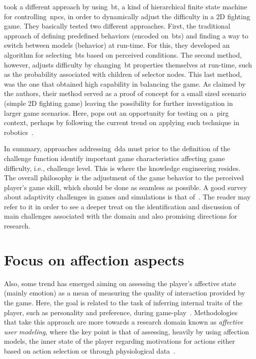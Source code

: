 \cite{sejrsgaard-jacobsen_dynamic_2011} took a different approach by using~\gls{bt}, a kind of hierarchical finite state machine for controlling~\gls{npc}s, in order to dynamically adjust the difficulty in a 2D fighting game. They basically tested two different approaches. First, the traditional approach of defining predefined behaviors (encoded on~\gls{bt}s) and finding a way to switch between models (behavior) at run-time. For this, they developed an algorithm for selecting~\gls{bt}s based on perceived conditions. The second method, however, adjusts difficulty by changing~\gls{bt} properties themselves at run-time, such as the probability associated with children of selector nodes. This last method, was the one that obtained high capability in balancing the game. As claimed by the authors, their method served as a proof of concept for a small sized scenario (simple 2D fighting game) leaving the possibility for further investigation in larger game scenarios. Here, pops out an opportunity for testing on a~\gls{pirg} context, perhaps by following the current trend on applying such technique in robotics~\citep{scheper_behavior_2015, pereira_framework_2015, marzinotto_towards_2014}.

In summary, approaches addressing~\gls{dda} must prior to the definition of the challenge function identify important game characteristics affecting game difficulty, i.e., challenge level. This is where the knowledge engineering resides. The overall philosophy is the adjustment of the game behavior to the perceived player's game skill, which should be done as seamless as possible. A good survey about adaptivity challenges in games and simulations is that of~\cite{lopes_adaptivity_2011}. The reader may refer to it in order to see a deeper treat on the identification and discussion of main challenges associated with the domain and also promising directions for research.

\section{Focus on affection aspects}\label{affectmodeling}
Also, some trend has emerged aiming on assessing the player's affective state (mainly emotion) as a mean of measuring the quality of interaction provided by the game. Here, the goal is related to the task of inferring internal traits of the player, such as personality and preference, during game-play~\citep{van_lankveld_psychologically_2009}. Methodologies that take this approach are more towards a research domain known as \textit{affective user modeling}, where the key point is that of assessing, heavily by using affection models, the inner state of the player regarding motivations for actions either based on action selection or through physiological data~\citep{van_lankveld_psychologically_2009}.

